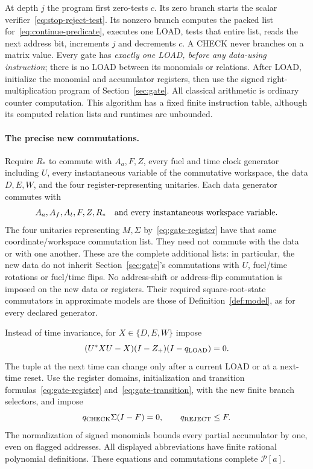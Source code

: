 At depth $j$ the program first zero-tests $c$. Its zero branch starts the scalar verifier~\eqref{eq:stop-reject-test}. Its nonzero branch computes the packed list for~\eqref{eq:continue-predicate}, executes one LOAD, tests that entire list, reads the next address bit, increments $j$ and decrements $c$. A CHECK never branches on a matrix value. Every gate has \emph{exactly one LOAD, before any data-using instruction}; there is no LOAD between its monomials or relations. After LOAD, initialize the monomial and accumulator registers, then use the signed right-multiplication program of Section~\ref{sec:gate}. All classical arithmetic is ordinary counter computation. This algorithm has a fixed finite instruction table, although its computed relation lists and runtimes are unbounded.

\paragraph{The precise new commutations.}
Require $R_*$ to commute with $A_a,F,Z$, every fuel and time clock generator including $U$, every instantaneous variable of the commutative workspace, the data $D,E,W$, and the four register-representing unitaries. Each data generator commutes with
\[
 A_a,A_f,A_t,F,Z,R_*\quad\hbox{and every instantaneous workspace variable}.
\]
The four unitaries representing $M,\Sigma$ by~\eqref{eq:gate-register} have that same coordinate/workspace commutation list. They need not commute with the data or with one another. These are the complete additional lists: in particular, the new data do not inherit Section~\ref{sec:gate}'s commutations with $U$, fuel/time rotations or fuel/time flips. No address-shift or address-flip commutation is imposed on the new data or registers. Their required square-root-state commutators in approximate models are those of Definition~\ref{def:model}, as for every declared generator.

Instead of time invariance, for $X\in\{D,E,W\}$ impose
\begin{equation}\label{eq:loaded-data-hold}
 (U^*XU-X)(I-Z_+)(I-q_{\rm LOAD})=0.
\end{equation}
The tuple at the next time can change only after a current LOAD or at a next-time reset. Use the register domains, initialization and transition formulas~\eqref{eq:gate-register} and~\eqref{eq:gate-transition}, with the new finite branch selectors, and impose
\begin{equation}\label{eq:limit-check-reject}
 q_{\rm CHECK}\Sigma(I-F)=0,\qquad q_{\rm REJECT}\le F.
\end{equation}
The normalization of signed monomials bounds every partial accumulator by one, even on flagged addresses. All displayed abbreviations have finite rational polynomial definitions. These equations and commutations complete $\mathcal P[a]$.

